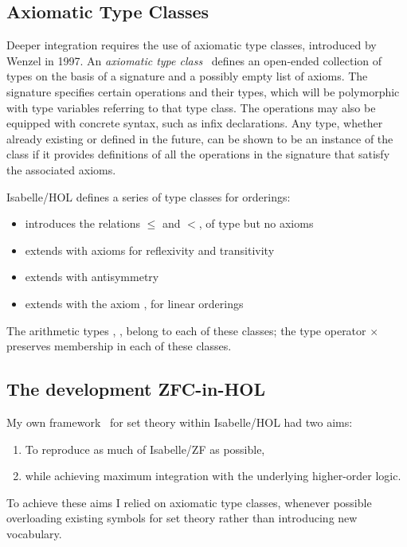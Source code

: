 \documentclass[runningheads]{llncs}
\begin{document}
\subsection{Axiomatic Type Classes}

Deeper integration requires the use of axiomatic type classes, introduced by Wenzel in 1997.
An \textit{axiomatic type class}~\cite{wenzel-type} defines an open-ended collection of types on the basis of a signature and a possibly empty list of axioms. The signature specifies certain operations and their types, which will be polymorphic with type variables referring to that type class.
The operations may also be equipped with concrete syntax, such as infix declarations.
Any type, whether already existing or defined in the future, can be shown to be an instance of the class if it provides definitions of all the operations in the signature that satisfy the associated axioms.

Isabelle/HOL defines a series of type classes for orderings:
\begin{itemize}
	\item {} introduces the relations $\le$ and $<$, of type  but no axioms
	\item {} extends  with axioms for reflexivity and transitivity
	\item {} extends  with antisymmetry
	\item {} extends  with the axiom , for linear orderings
\end{itemize}
The arithmetic types , ,  belong to each of these classes; the type operator $\times$ preserves membership in each of these classes.

\subsection{The development ZFC-in-HOL}

My own framework~\cite{ZFC_in_HOL-AFP} for set theory within Isabelle/HOL had two aims:
\begin{enumerate}
	\item To reproduce as much of Isabelle/ZF as possible,
	\item while achieving maximum integration with the underlying higher-order logic.
\end{enumerate}
To achieve these aims I relied on axiomatic type classes, whenever possible overloading existing symbols for set theory rather than introducing new vocabulary.
\end{document}
